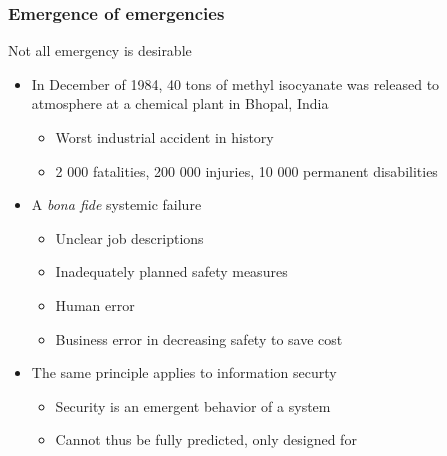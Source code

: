 \documentclass[10pt, compress]{beamer}
\begin{document}
\begin{frame}[fragile]
  \frametitle{Emergence of emergencies}
  	Not all emergency is desirable
  	\begin{itemize}
  		\item In December of 1984, 40 tons of methyl isocyanate was released to atmosphere at a chemical plant in Bhopal, India
		\begin{itemize}
			\item Worst industrial accident in history 
			\item 2 000 fatalities, 200 000 injuries, 10 000 permanent disabilities \citep[conservative estimates]{leveson2011engineering}
		\end{itemize}
		\item A \textit{bona fide} systemic failure
		\begin{itemize}
			\item Unclear job descriptions
			\item Inadequately planned safety measures
			\item Human error
			\item Business error in decreasing safety to save cost
		\end{itemize}
		\item The same principle applies to information securty
		\begin{itemize}
			\item Security is an emergent behavior of a system
			\item Cannot thus be fully predicted, only designed for
		\end{itemize}
	\end{itemize}
\end{frame}
\end{document}
